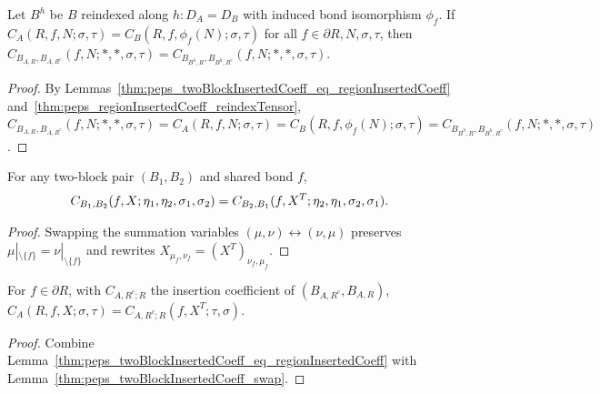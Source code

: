 \begin{lemma}%
    \label{thm:peps_sameTwoBlockInsertions_of_regionInsertedCoeff_eq}
    \leanok
    Let $B^h$ be $B$ reindexed along $h:D_A=D_B$ with induced bond isomorphism
    $\phi_f$. If $C_A(R,f,N;\sigma,\tau)=C_B(R,f,\phi_f(N);\sigma,\tau)$ for all
    $f\in\partial R,N,\sigma,\tau$, then
    $C_{B_{A,R},B_{A,R^c}}(f,N;*,*,\sigma,\tau)
        =C_{B_{B^h,R},B_{B^h,R^c}}(f,N;*,*,\sigma,\tau)$.
\end{lemma}
\begin{proof}\leanok
    By Lemmas~\ref{thm:peps_twoBlockInsertedCoeff_eq_regionInsertedCoeff}
    and~\ref{thm:peps_regionInsertedCoeff_reindexTensor},
    $C_{B_{A,R},B_{A,R^c}}(f,N;*,*,\sigma,\tau)
        =C_A(R,f,N;\sigma,\tau)
        =C_B(R,f,\phi_f(N);\sigma,\tau)
        =C_{B_{B^h,R},B_{B^h,R^c}}(f,N;*,*,\sigma,\tau)$.
\end{proof}

\begin{lemma}
    \label{thm:peps_twoBlockInsertedCoeff_swap}
    \leanok
    For any two-block pair $(B_1,B_2)$ and shared bond $f$,
    \begin{align}
        C_{B_1,B_2}(f,X;\eta_1,\eta_2,\sigma_1,\sigma_2)
         & =
        C_{B_2,B_1}(f,X^T;\eta_2,\eta_1,\sigma_2,\sigma_1).
        \notag
    \end{align}
\end{lemma}
\begin{proof}\leanok
    Swapping the summation variables $(\mu,\nu)\leftrightarrow(\nu,\mu)$
    preserves $\mu|_{\setminus\{f\}}=\nu|_{\setminus\{f\}}$ and rewrites
    $X_{\mu_f,\nu_f}=(X^T)_{\nu_f,\mu_f}$.
\end{proof}

\begin{lemma}
    \label{thm:peps_regionInsertedCoeff_complement_reading}
    \leanok
    For $f\in\partial R$, with $C_{A,R^c;R}$ the insertion coefficient of
    $(B_{A,R^c},B_{A,R})$,
    $C_A(R,f,X;\sigma,\tau)=C_{A,R^c;R}(f,X^T;\tau,\sigma)$.
\end{lemma}
\begin{proof}\leanok
    Combine Lemma~\ref{thm:peps_twoBlockInsertedCoeff_eq_regionInsertedCoeff}
    with Lemma~\ref{thm:peps_twoBlockInsertedCoeff_swap}.
\end{proof}

